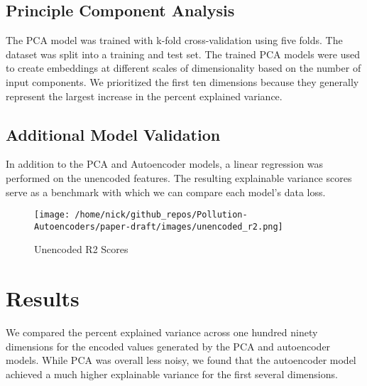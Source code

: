 \documentclass{article}
\newcommand\note[1]{\textbf{\textcolor{red}{#1}}}
\newcommand{\comment}[1]{}
\begin{document}
\subsection{Principle Component Analysis}
The PCA model was trained with k-fold cross-validation using five folds. The dataset was split into a training and test set. The trained PCA models were used to create embeddings at different scales of dimensionality based on the number of input components. We prioritized the first ten dimensions because they generally represent the largest increase in the percent explained variance.

\subsection{Additional Model Validation}
In addition to the PCA and Autoencoder models, a linear regression was performed on the unencoded features. The resulting explainable variance scores serve as a benchmark with which we can compare each model's data loss. 

\begin{figure}[h!]
    \centering
    \caption{Unencoded R2 Scores}
    \label{fig:pipeline}
    \texttt{[image: /home/nick/github\_repos/Pollution-Autoencoders/paper-draft/images/unencoded\_r2.png]}
\end{figure}

\section{Results}
We compared the percent explained variance across one hundred ninety dimensions for the encoded values generated by the PCA and autoencoder models. While PCA was overall less noisy, we found that the autoencoder model achieved a much higher explainable variance for the first several dimensions.
\comment{
\\ \note{Note that results graphs are placeholders}

\begin{figure}[h!]
\begin{subfigure}{0.5\textwidth}
    \texttt{[image: /home/nick/github\_repos/Pollution-Autoencoders/paper-draft/images/pca\_all\_dims.png]} 
    \caption{PCA Dimensionality Reduction}
    \label{fig:ae_dim_reduction}
\end{subfigure}%
\begin{subfigure}{0.5\textwidth}
    \texttt{[image: /home/nick/github\_repos/Pollution-Autoencoders/paper-draft/images/ae\_all\_dims.png]}
    \caption{PCA Dimensionality Reduction}
    \label{fig:pca_dim_reduction}
\end{subfigure}
\caption{Graph of autoencoder and PCA reduced representations of air pollutants}
\label{fig:ae_vs_pca}
\end{figure}
}
\end{document}
